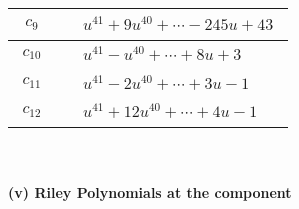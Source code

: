 \documentclass[1p]{elsarticle_modified}
\theoremstyle{definition}
\begin{document}
\begin{tabular}{m{50pt}|m{274pt}}
\hline $$\begin{aligned}c_{9}\end{aligned}$$&$\begin{aligned}
&u^{41}+9 u^{40}+\cdots-245 u+43
\end{aligned}$\\
\hline $$\begin{aligned}c_{10}\end{aligned}$$&$\begin{aligned}
&u^{41}- u^{40}+\cdots+8 u+3
\end{aligned}$\\
\hline $$\begin{aligned}c_{11}\end{aligned}$$&$\begin{aligned}
&u^{41}-2 u^{40}+\cdots+3 u-1
\end{aligned}$\\
\hline $$\begin{aligned}c_{12}\end{aligned}$$&$\begin{aligned}
&u^{41}+12 u^{40}+\cdots+4 u-1
\end{aligned}$\\
\hline
\end{tabular}\\~\\
\newpage\renewcommand{\arraystretch}{1}
\flushleft \textbf{(v) Riley Polynomials at the component}\newline \\
\end{document}
